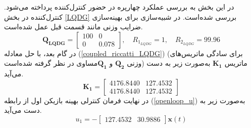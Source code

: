 



در این بخش به بررسی عملکرد چهارپره در حضور کنترل‌کننده  پرداخته می‌شود. کنترل‌کننده  در بخش
\ref{LQDG}
بررسی شده‌است.
 در شبیه‌سازی برای بهینه‌سازی ضرایب وزنی مانند قسمت قبل عمل شده‌است.
\begin{equation}
	\boldsymbol{Q_{LQDG}} = \begin{bmatrix}
		100 & 0\\
		0 & 0.078
	\end{bmatrix}, \quad R_{1_{LQDG}} =  1, \quad R_{2_{LQDG}} =  99.96
\end{equation}
در گام بعد، با حل معادله
(\ref{coupled_riccatti_LQDG})
(برای سادگی ماتریس‌های وزنی $\boldsymbol{{Q}_{2}}$ و $\boldsymbol{{Q}_{1}}$مساوی در نظر گرفته شده‌است)
ماتریس
$\boldsymbol{{K}_1}$
به‌صورت زیر به دست می‌آید.
\begin{equation}
	\boldsymbol{K_1} = \begin{bmatrix}
		
4176.8440 & 127.4532 \\ 
4176.8440 & 127.4532 
	\end{bmatrix}
\end{equation}
در نهایت فرمان کنترلی بهینه بازیکن اول از رابطه
(\ref{openloop_u})
به‌صورت زیر به دست می‌آید.
\begin{equation}
	u_1 = -\begin{bmatrix}
		127.4532 &  30.9886
	\end{bmatrix}\boldsymbol{x}(t)
\end{equation}


